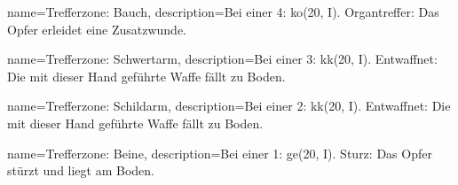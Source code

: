 {
    name={Trefferzone: Bauch},
    description={Bei einer 4: \gls{ko}(20, I). Organtreffer: Das Opfer erleidet eine Zusatzwunde.}}

{
    name={Trefferzone: Schwertarm},
    description={Bei einer 3: \gls{kk}(20, I). Entwaffnet: Die mit dieser Hand geführte Waffe fällt zu Boden.}}

{
    name={Trefferzone: Schildarm},
    description={Bei einer 2: \gls{kk}(20, I). Entwaffnet: Die mit dieser Hand geführte Waffe fällt zu Boden.}}

{
    name={Trefferzone: Beine},
    description={Bei einer 1: \gls{ge}(20, I). Sturz: Das Opfer stürzt und liegt am Boden.}}